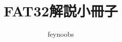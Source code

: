 \documentclass[a4j]{jarticle}
\title{FAT32解説小冊子}
\author{feynoobs}
\begin{document}
\maketitle

\begin{abstract}

\end{abstract}
\end{document}
